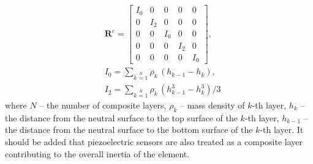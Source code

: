 \documentclass[preprint,12pt]{elsarticle}
\renewcommand{\bm}[1]{\mathbf{#1}}
\begin{document}
	\begin{equation}
	\begin{split}
	&\bm{R}^e = \left[\begin{array}{ccccc} I_0 & 0&0&0&0 \\ 0& I_2&0&0&0 \\0&0&I_0&0&0\\0&0&0&I_2&0\\ 0&0&0&0&I_0 \end{array}\right],\\
	&I_0 =  \sum \limits_{k=1}\limits^{N} \rho_k \,(h_{k-1} - h_k),\\ 
	& I_2 =  \sum \limits_{k=1}\limits^{N} \rho_k \,(h_{k-1}^3 - h_k^3)/3
	\label{eq:delam_plate_mass_dens}
	\end{split}
	\end{equation}
	where $N$ -- the number of composite layers, $\rho_k$ -- mass density of $k$-th layer, $h_k$ -- the distance from the neutral surface to the top surface of the $k$-th layer, $h_{k-1}$ -- the distance from the neutral surface to the bottom surface of the $k$-th layer. It should be added that piezoelectric sensors are also treated as a composite layer contributing to the overall inertia of the element.
	
\end{document}

